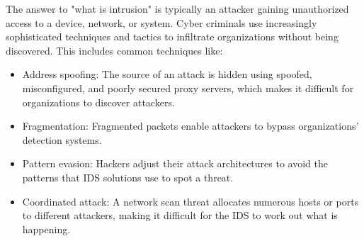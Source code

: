 The answer to "what is intrusion" is typically an attacker gaining unauthorized access to a device, network, or system. 
Cyber criminals use increasingly sophisticated techniques and tactics to infiltrate organizations without being discovered. 
This includes common techniques like:
\begin{itemize}
    \item Address spoofing: The source of an attack is hidden using spoofed, misconfigured, and poorly secured proxy servers, which makes it difficult for organizations to discover attackers.
    \item Fragmentation: Fragmented packets enable attackers to bypass organizations’ detection systems.
    \item Pattern evasion: Hackers adjust their attack architectures to avoid the patterns that IDS solutions use to spot a threat.
    \item Coordinated attack: A network scan threat allocates numerous hosts or ports to different attackers, making it difficult for the IDS to work out what is happening.
\end{itemize}

